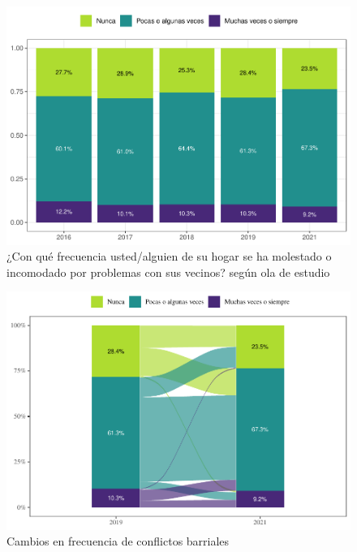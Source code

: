 \documentclass[
  12pt,
]{book}
\begin{document}
\begin{figure}

{\centering \includegraphics{reporte-elsoc_files/figure-latex/confli-olas-1} 

}

\caption{¿Con qué frecuencia usted/alguien de su hogar se ha molestado o incomodado por problemas con sus vecinos? según ola de estudio }\label{fig:confli-olas}
\end{figure}

\begin{figure}

{\centering \includegraphics{reporte-elsoc_files/figure-latex/confli-cambio-1} 

}

\caption{Cambios en frecuencia de conflictos barriales}\label{fig:confli-cambio}
\end{figure}
\end{document}
